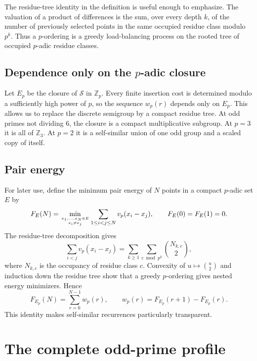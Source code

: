 \documentclass[11pt]{article}
\theoremstyle{definition}
\theoremstyle{remark}
\newcommand{\Z}{\mathbb Z}
\newcommand{\calS}{\mathcal S}
\begin{document}
The residue-tree identity in the definition is useful enough to emphasize.  The valuation of a product of differences is the sum, over every depth $k$, of the number of previously selected points in the same occupied residue class modulo $p^k$.  Thus a $p$-ordering is a greedy load-balancing process on the rooted tree of occupied $p$-adic residue classes.

\subsection{Dependence only on the $p$-adic closure}
Let $E_p$ be the closure of $\calS$ in $\Z_p$.  Every finite insertion cost is determined modulo a sufficiently high power of $p$, so the sequence $w_p(r)$ depends only on $E_p$.  This allows us to replace the discrete semigroup by a compact residue tree.  At odd primes not dividing $6$, the closure is a compact multiplicative subgroup.  At $p=3$ it is all of $\Z_3$.  At $p=2$ it is a self-similar union of one odd group and a scaled copy of itself.

\subsection{Pair energy}
For later use, define the minimum pair energy of $N$ points in a compact $p$-adic set $E$ by
\[
  F_E(N)=\min_{x_1,\dots,x_N\in E\atop x_i\ne x_j}
       \sum_{1\le i<j\le N}v_p(x_i-x_j),
       \qquad F_E(0)=F_E(1)=0.
\]
The residue-tree decomposition gives
\[
  \sum_{i<j}v_p(x_i-x_j)
  =\sum_{k\ge1}\sum_{c\bmod p^k}\binom{N_{k,c}}2,
\]
where $N_{k,c}$ is the occupancy of residue class $c$.  Convexity of $u\mapsto\binom u2$ and induction down the residue tree show that a greedy $p$-ordering gives nested energy minimizers.  Hence
\begin{equation}\label{eq:energy-increments}
       F_{E_p}(N)=\sum_{r=0}^{N-1}w_p(r),
       \qquad w_p(r)=F_{E_p}(r+1)-F_{E_p}(r).
\end{equation}
This identity makes self-similar recurrences particularly transparent.

\section{The complete odd-prime profile}
\end{document}
